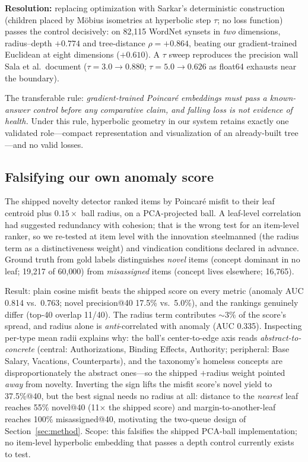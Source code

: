 \documentclass[11pt]{article}
\begin{document}
\textbf{Resolution:} replacing optimization with Sarkar's deterministic construction \cite{sarkar2011,sala2018} (children placed by M\"obius isometries at hyperbolic step $\tau$; no loss function) passes the control decisively: on 82{,}115 WordNet synsets in \emph{two} dimensions, radius--depth $+0.774$ and tree-distance $\rho = +0.864$, beating our gradient-trained Euclidean at eight dimensions ($+0.610$). A $\tau$ sweep reproduces the precision wall Sala et al.\ document ($\tau{=}3.0 \rightarrow 0.880$; $\tau{=}5.0 \rightarrow 0.626$ as float64 exhausts near the boundary).

The transferable rule: \emph{gradient-trained Poincar\'e embeddings must pass a known-answer control before any comparative claim, and falling loss is not evidence of health.} Under this rule, hyperbolic geometry in our system retains exactly one validated role---compact representation and visualization of an already-built tree---and no valid losses.

\subsection{Falsifying our own anomaly score}\label{sec:anomaly}
The shipped novelty detector ranked items by Poincar\'e misfit to their leaf centroid plus $0.15\times$ ball radius, on a PCA-projected ball. A leaf-level correlation had suggested redundancy with cohesion; that is the wrong test for an item-level ranker, so we re-tested at item level with the innovation steelmanned (the radius term as a distinctiveness weight) and vindication conditions declared in advance. Ground truth from gold labels distinguishes \emph{novel} items (concept dominant in no leaf; 19{,}217 of 60{,}000) from \emph{misassigned} items (concept lives elsewhere; 16{,}765).

Result: plain cosine misfit beats the shipped score on every metric (anomaly AUC 0.814 vs.\ 0.763; novel precision@40 17.5\% vs.\ 5.0\%), and the rankings genuinely differ (top-40 overlap 11/40). The radius term contributes $\sim$3\% of the score's spread, and radius alone is \emph{anti}-correlated with anomaly (AUC 0.335). Inspecting per-type mean radii explains why: the ball's center-to-edge axis reads \emph{abstract-to-concrete} (central: Authorizations, Binding Effects, Authority; peripheral: Base Salary, Vacations, Counterparts), and the taxonomy's homeless concepts are disproportionately the abstract ones---so the shipped $+$radius weight pointed \emph{away} from novelty. Inverting the sign lifts the misfit score's novel yield to 37.5\%@40, but the best signal needs no radius at all: distance to the \emph{nearest} leaf reaches 55\% novel@40 (11$\times$ the shipped score) and margin-to-another-leaf reaches 100\% misassigned@40, motivating the two-queue design of Section~\ref{sec:method}. Scope: this falsifies the shipped PCA-ball implementation; no item-level hyperbolic embedding that passes a depth control currently exists to test.
\end{document}
